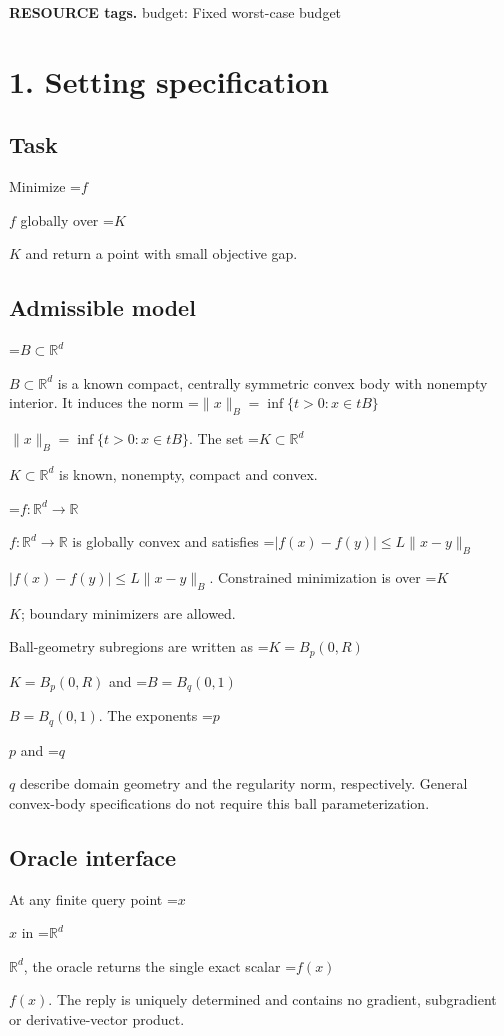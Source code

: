 \documentclass[10pt,a4paper]{article}
\newcommand{\AtlasMath}[1]{\par\begingroup\centering\setbox0=\hbox{$\displaystyle #1$}\ifdim\wd0>1.4\linewidth\typeout{ATLAS WIDE FORMULA: \the\wd0}\fi\ifdim\wd0>\linewidth\resizebox{\linewidth}{!}{\box0}\else\box0\fi\par\endgroup}
\newcommand{\AtlasInlineMath}[1]{\begingroup\setbox0=\hbox{$#1$}\ifdim\wd0>.4\linewidth\endgroup\AtlasMath{#1}\else\endgroup$#1$\fi}
\begin{document}
\textbf{RESOURCE tags.} budget: Fixed worst-case budget



\section{1. Setting specification}


\subsection{Task}


Minimize \AtlasInlineMath{f} globally over \AtlasInlineMath{K} and return a point with small objective gap.



\subsection{Admissible model}


\AtlasInlineMath{B\subset\mathbb{R}^d} is a known compact, centrally symmetric convex body with nonempty interior. It induces the norm \AtlasInlineMath{\|x\|_B=\inf\{t>0:x\in tB\}}. The set \AtlasInlineMath{K\subset\mathbb{R}^d} is known, nonempty, compact and convex.



\AtlasInlineMath{f:\mathbb{R}^d\to\mathbb{R}} is globally convex and satisfies \AtlasInlineMath{|f(x)-f(y)|\le L\|x-y\|_B}. Constrained minimization is over \AtlasInlineMath{K}; boundary minimizers are allowed.



Ball-geometry subregions are written as \AtlasInlineMath{K=B_p(0,R)} and \AtlasInlineMath{B=B_q(0,1)}. The exponents \AtlasInlineMath{p} and \AtlasInlineMath{q} describe domain geometry and the regularity norm, respectively. General convex-body specifications do not require this ball parameterization.



\subsection{Oracle interface}


At any finite query point \AtlasInlineMath{x} in \AtlasInlineMath{\mathbb{R}^d}, the oracle returns the single exact scalar \AtlasInlineMath{f(x)}. The reply is uniquely determined and contains no gradient, subgradient or derivative-vector product.
\end{document}
